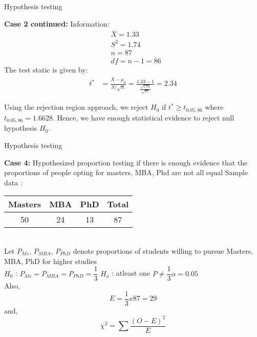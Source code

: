 \documentclass{beamer}
\begin{document}
    \begin{frame}{Hypothesis testing}
        \begin{block}{\textbf{Case 2 continued:}}
            Information:
             \begin{align}
                 &\bar{X}= 1.33\\
                 &S^2 = 1.74\\
                 &n=87\\
                 &df = n-1 = 86
             \end{align}
             The test static is given by:
             \begin{align}
                 t^* &= \frac{\bar{X} - \mu_0}{ S/ \sqrt{n}}
                 = \frac{1.33 - 1}{\frac{\sqrt{1.74}}{\sqrt{87}}}
                 = 2.34
             \end{align}

             Using the rejection region approach, we reject $H_0$ if $ t^* \geq t_{0.05,86}$ where $t_{0.05,86} = 1.6628$. Hence, we have enough statistical evidence to reject null hypothesis $H_0$.
        \end{block}
    \end{frame}

    \begin{frame}{Hypothesis testing}
    
  \begin{block}{\textbf{Case 4:} Hypothesized proportion testing if there is enough evidence that the proportions of people opting for masters, MBA, Phd are not all equal}
    Sample data :
    \begin{tabular}{|c|c|c|c|}
        \hline
        Masters & MBA & PhD & Total\\
        \hline
        50 & 24 & 13 & 87 \\
        \hline
    \end{tabular}\\

    Let $P_{Ms}$, $P_{MBA}$, $P_{PhD}$ denote proportions of students willing to pursue Masters, MBA, PhD for higher studies \\

    $H_{0}$ :  $P_{Ms} = P_{MBA} = P_{PhD} = \dfrac{1}{3}$ \space \space \space \space $H_{a}$ : atleast one $P \neq \dfrac{1}{3}$\space \space \space \space $\alpha =0.05$\\

    Also,
    \begin{equation}
        E = \dfrac{1}{3} x 87 = 29
    \end{equation}
    and,
    \begin{equation}
        \chi^{2} = \sum\dfrac{(O - E)^{2}}{E}
    \end{equation}  
    \end{block}
\end{frame}
\end{document}
